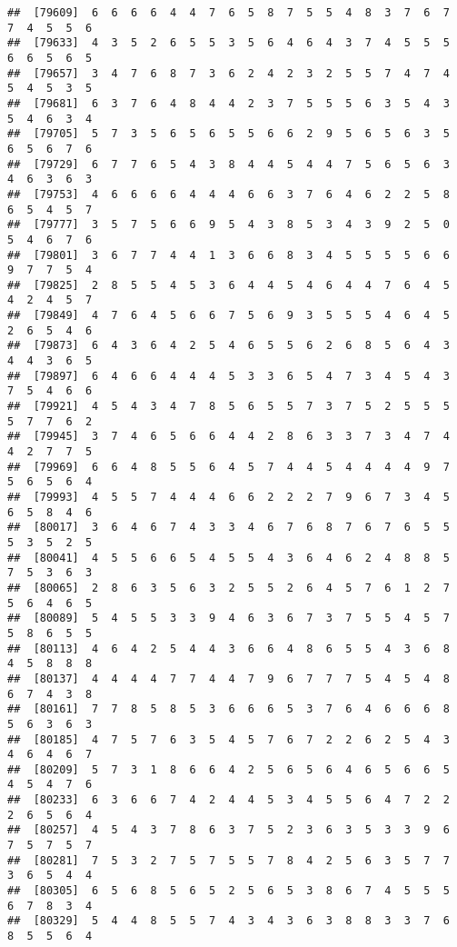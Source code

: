 \documentclass[
]{book}
\begin{document}
\begin{verbatim}
##  [79609]  6  6  6  6  4  4  7  6  5  8  7  5  5  4  8  3  7  6  7  7  4  5  5  6
##  [79633]  4  3  5  2  6  5  5  3  5  6  4  6  4  3  7  4  5  5  5  6  6  5  6  5
##  [79657]  3  4  7  6  8  7  3  6  2  4  2  3  2  5  5  7  4  7  4  5  4  5  3  5
##  [79681]  6  3  7  6  4  8  4  4  2  3  7  5  5  5  6  3  5  4  3  5  4  6  3  4
##  [79705]  5  7  3  5  6  5  6  5  5  6  6  2  9  5  6  5  6  3  5  6  5  6  7  6
##  [79729]  6  7  7  6  5  4  3  8  4  4  5  4  4  7  5  6  5  6  3  4  6  3  6  3
##  [79753]  4  6  6  6  6  4  4  4  6  6  3  7  6  4  6  2  2  5  8  6  5  4  5  7
##  [79777]  3  5  7  5  6  6  9  5  4  3  8  5  3  4  3  9  2  5  0  5  4  6  7  6
##  [79801]  3  6  7  7  4  4  1  3  6  6  8  3  4  5  5  5  5  6  6  9  7  7  5  4
##  [79825]  2  8  5  5  4  5  3  6  4  4  5  4  6  4  4  7  6  4  5  4  2  4  5  7
##  [79849]  4  7  6  4  5  6  6  7  5  6  9  3  5  5  5  4  6  4  5  2  6  5  4  6
##  [79873]  6  4  3  6  4  2  5  4  6  5  5  6  2  6  8  5  6  4  3  4  4  3  6  5
##  [79897]  6  4  6  6  4  4  4  5  3  3  6  5  4  7  3  4  5  4  3  7  5  4  6  6
##  [79921]  4  5  4  3  4  7  8  5  6  5  5  7  3  7  5  2  5  5  5  5  7  7  6  2
##  [79945]  3  7  4  6  5  6  6  4  4  2  8  6  3  3  7  3  4  7  4  4  2  7  7  5
##  [79969]  6  6  4  8  5  5  6  4  5  7  4  4  5  4  4  4  4  9  7  5  6  5  6  4
##  [79993]  4  5  5  7  4  4  4  6  6  2  2  2  7  9  6  7  3  4  5  6  5  8  4  6
##  [80017]  3  6  4  6  7  4  3  3  4  6  7  6  8  7  6  7  6  5  5  5  3  5  2  5
##  [80041]  4  5  5  6  6  5  4  5  5  4  3  6  4  6  2  4  8  8  5  7  5  3  6  3
##  [80065]  2  8  6  3  5  6  3  2  5  5  2  6  4  5  7  6  1  2  7  5  6  4  6  5
##  [80089]  5  4  5  5  3  3  9  4  6  3  6  7  3  7  5  5  4  5  7  5  8  6  5  5
##  [80113]  4  6  4  2  5  4  4  3  6  6  4  8  6  5  5  4  3  6  8  4  5  8  8  8
##  [80137]  4  4  4  4  7  7  4  4  7  9  6  7  7  7  5  4  5  4  8  6  7  4  3  8
##  [80161]  7  7  8  5  8  5  3  6  6  6  5  3  7  6  4  6  6  6  8  5  6  3  6  3
##  [80185]  4  7  5  7  6  3  5  4  5  7  6  7  2  2  6  2  5  4  3  4  6  4  6  7
##  [80209]  5  7  3  1  8  6  6  4  2  5  6  5  6  4  6  5  6  6  5  4  5  4  7  6
##  [80233]  6  3  6  6  7  4  2  4  4  5  3  4  5  5  6  4  7  2  2  2  6  5  6  4
##  [80257]  4  5  4  3  7  8  6  3  7  5  2  3  6  3  5  3  3  9  6  7  5  7  5  7
##  [80281]  7  5  3  2  7  5  7  5  5  7  8  4  2  5  6  3  5  7  7  3  6  5  4  4
##  [80305]  6  5  6  8  5  6  5  2  5  6  5  3  8  6  7  4  5  5  5  6  7  8  3  4
##  [80329]  5  4  4  8  5  5  7  4  3  4  3  6  3  8  8  3  3  7  6  8  5  5  6  4

\end{verbatim}
\end{document}
